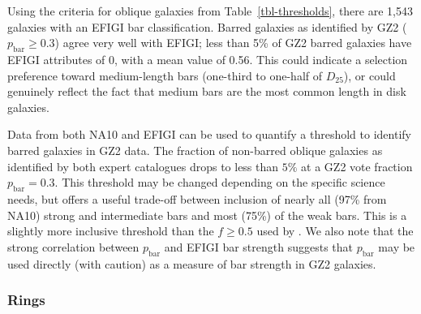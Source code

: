 \documentclass[useAMS,usenatbib]{mn2e}
\begin{document}
Using the criteria for oblique galaxies from Table~\ref{tbl-thresholds}, there are 1,543 galaxies with an EFIGI bar classification. Barred galaxies as identified by GZ2 ($p_\mathrm{bar}\geq0.3$) agree very well with EFIGI; less than 5\% of GZ2 barred galaxies have EFIGI attributes of 0, with a mean value of 0.56. This could indicate a selection preference toward medium-length bars (one-third to one-half of $D_{25}$), or could genuinely reflect the fact that medium bars are the most common length in disk galaxies. 

Data from both NA10 and EFIGI can be used to quantify a threshold to identify barred galaxies in GZ2 data. The fraction of non-barred oblique galaxies as identified by both expert catalogues drops to less than $5\%$ at a GZ2 vote fraction $p_\mathrm{bar}=0.3$. This threshold may be changed depending on the specific science needs, but offers a useful trade-off between inclusion of nearly all (97\% from NA10) strong and intermediate bars and most (75\%) of the weak bars. This is a slightly more inclusive threshold than the $f\geq0.5$ used by \citet{mas11c}. We also note that the strong correlation between $p_\mathrm{bar}$ and EFIGI bar strength suggests that $p_\mathrm{bar}$ may be used directly (with caution) as a measure of bar strength in GZ2 galaxies.




\subsubsection{Rings}
\end{document}
